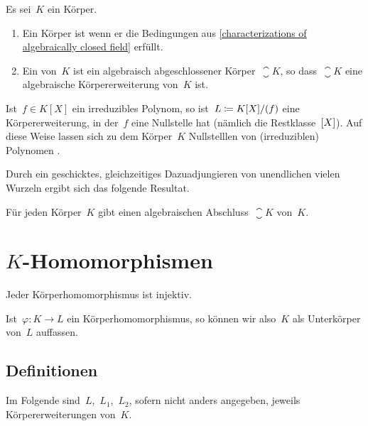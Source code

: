 \begin{definition}
  Es sei~$K$ ein Körper.
  \begin{enumerate}
    \item
      Ein Körper ist  wenn er die Bedingungen aus \cref{characterizations of algebraically closed field} erfüllt.
    \item
      Ein  von~$K$ ist ein algebraisch abgeschlossener Körper~$\closure{K}$, so dass~$\closure{K}$ eine algebraische Körpererweiterung von~$K$ ist.
  \end{enumerate}
\end{definition}

Ist~$f \in K[X]$ ein irreduzibles Polynom, so ist~$L \coloneqq K[X]/(f)$ eine Körpererweiterung, in der~$f$ eine Nullstelle hat (nämlich die Restklasse~$[X]$).
Auf diese Weise lassen sich zu dem Körper~$K$ Nullstelllen von (irreduziblen) Polynomen .

Durch ein geschicktes, gleichzeitiges Dazuadjungieren von unendlichen vielen Wurzeln ergibt sich das folgende Resultat.

\begin{theorem}[Steinitz]
  Für jeden Körper~$K$ gibt einen algebraischen Abschluss~$\closure{K}$ von~$K$.
\end{theorem}





\section{\texorpdfstring{$K$}{K}-Homomorphismen}

\begin{proposition}
  Jeder Körperhomomorphismus ist injektiv.
\end{proposition}

\begin{remark}
  Ist~$\varphi \colon K \to L$ ein Körperhomomorphismus, so können wir also~$K$ als Unterkörper von~$L$ auffassen.
\end{remark}



\subsection{Definitionen}

\begin{convention}
  Im Folgende sind~$L$,~$L_1$,~$L_2$, sofern nicht anders angegeben, jeweils Körpererweiterungen von~$K$.
\end{convention}

